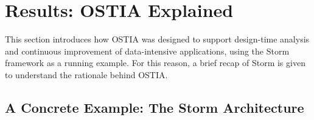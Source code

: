 \documentclass[smallextended]{svjour3}       %
\newcommand{\comment}[1]{{\textbf{\color{red}[#1]}}}
\begin{document}


\section{Results: OSTIA Explained}
\label{rs}
%
%



This section introduces how OSTIA was designed to support design-time analysis and continuous improvement of data-intensive applications, using the Storm framework as a running example.
For this reason, a brief recap of Storm is given to understand the rationale behind OSTIA.

\subsection{A Concrete Example: The Storm Architecture}
\end{document}
